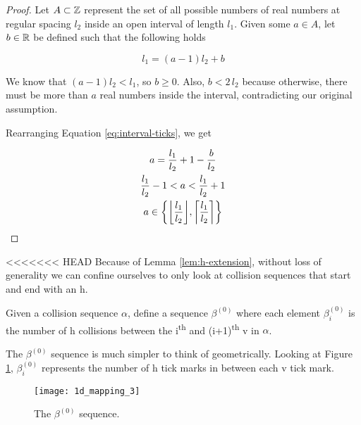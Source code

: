 \begin{proof}
	Let $A \subset \mathbb Z$ represent the set of all possible numbers of real numbers at regular spacing $l_2$ inside an open interval of length $l_1$. Given some $a \in A$, let $b \in \mathbb R$ be defined such that the following holds

	\begin{equation}\label{eq:interval-ticks}
		l_1 = (a - 1) l_2 + b
	\end{equation}

	We know that $(a - 1) l_2 < l_1$, so $b \ge 0$. Also, $b < 2 \, l_2$ because otherwise, there must be more than $a$ real numbers inside the interval, contradicting our original assumption.

	Rearranging Equation \ref{eq:interval-ticks}, we get

	\begin{gather}
		a = \frac{l_1}{l_2} + 1 - \frac{b}{l_2}\\
		\frac{l_1}{l_2} - 1 < a < \frac{l_1}{l_2} + 1\\
		a \in \cbracket{\floor{\frac{l_1}{l_2}}, \ceil{\frac{l_1}{l_2}}}
	\end{gather}
\end{proof}


<<<<<<< HEAD
Because of Lemma \ref{lem:h-extension}, without loss of generality we can confine ourselves to only look at collision sequences that start and end with an h.

\begin{definition}
	Given a collision sequence $\alpha$, define a sequence $\beta^{(0)}$ where each element $\beta^{(0)}_i$ is the number of h collisions between the i\textsuperscript{th} and (i+1)\textsuperscript{th} v in $\alpha$.
\end{definition}

The $\beta^{(0)}$ sequence is much simpler to think of geometrically. Looking at Figure \ref{fig:beta-sequence}, $\beta^{(0)}_i$ represents the number of h tick marks in between each v tick mark.

\begin{figure}[H]
  \begin{center}
    \texttt{[image: 1d\_mapping\_3]}
  \end{center}
  \vspace{-.2in} %
  \caption{\label{fig:beta-sequence} The $\beta^{(0)}$ sequence.}
\end{figure}

